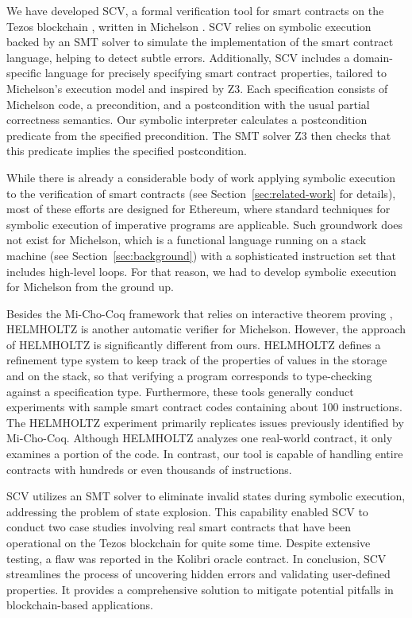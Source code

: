 \documentclass[runningheads]{llncs}
\begin{document}
We have developed SCV, a formal verification tool for smart contracts on the Tezos blockchain \cite{tezos-whitepaper}, written in Michelson \cite{michelson}. SCV relies on symbolic execution backed by an SMT solver to simulate the implementation of the smart contract language, helping to detect subtle errors. Additionally, SCV includes a domain-specific language for precisely specifying smart contract properties, tailored to Michelson's execution model and inspired by Z3. Each specification consists of Michelson code, a precondition, and a postcondition with the usual partial correctness semantics. Our symbolic interpreter calculates a postcondition predicate from the specified precondition. The SMT solver Z3 \cite{z3} then checks that this predicate implies the specified postcondition.

While there is already a considerable body of work applying symbolic execution to the verification of smart contracts \cite{securify,manticore,kevm,park} (see Section~\ref{sec:related-work} for details), most of these efforts are designed for Ethereum, where standard techniques for symbolic execution of imperative programs are applicable. Such groundwork does not exist for Michelson, which is a functional language running on a stack machine (see Section~\ref{sec:background}) with a sophisticated instruction set that includes high-level loops. For that reason, we had to develop symbolic execution for Michelson from the ground up.

Besides the Mi-Cho-Coq framework that relies on interactive theorem proving \cite{micho}, HELMHOLTZ \cite{helmholtz} is another automatic verifier for Michelson. However, the approach of HELMHOLTZ is significantly different from ours. HELMHOLTZ defines a refinement type system to keep track of the properties of values in the storage and on the stack, so that verifying a program corresponds to type-checking against a specification type. Furthermore, these tools generally conduct experiments with sample smart contract codes containing about 100 instructions. The HELMHOLTZ experiment primarily replicates issues previously identified by Mi-Cho-Coq. Although HELMHOLTZ analyzes one real-world contract, it only examines a portion of the code. In contrast, our tool is capable of handling entire contracts with hundreds or even thousands of instructions.

SCV utilizes an SMT solver to eliminate invalid states during symbolic execution, addressing the problem of state explosion. This capability enabled SCV to conduct two case studies involving real smart contracts that have been operational on the Tezos blockchain for quite some time. Despite extensive testing, a flaw was reported in the Kolibri oracle contract. In conclusion, SCV streamlines the process of uncovering hidden errors and validating user-defined properties. It provides a comprehensive solution to mitigate potential pitfalls in blockchain-based applications.
\end{document}
